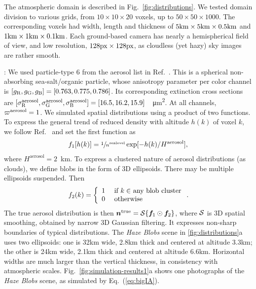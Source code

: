 \documentclass[10pt,letterpaper]{article}
\begin{document}
The atmospheric domain is described in Fig.~\ref{fig:distributions}.
We tested domain division to various grids, from $10\times10 \times
20$ voxels, up to $50\times50 \times 1000$. The corresponding voxels
had width, length and thickness of $5{\rm km}\times 5{\rm km} \times
0.5{\rm km}$ and $1{\rm km}\times 1{\rm km} \times 0.1{\rm km}$.  Each
ground-based camera has nearly a hemispherical field of view, and low
resolution, $128 \rm{px} \times 128 \rm{px}$, as cloudless (yet hazy)
sky images are rather smooth.

: We used particle-type 6 from the aerosol list
in Ref.~\cite{Martonchik2009}. This is a spherical non-absorbing
sea-salt/organic particle, whose anisotropy parameter per color
channel is $[g_{\rm R},g_{\rm G},g_{\rm B}]=[0.763,0.775,0.786]$. Its
corresponding extinction cross sections are $[\sigma^{\rm
  aerosol}_{\rm R}, \sigma^{\rm aerosol}_{\rm G}, \sigma^{\rm
  aerosol}_{\rm
  B}]=[16.5,16.2,15.9]$~\si[sticky-per]{\per\micro\meter\squared}.  At
all channels, $\varpi^{\rm aerosol}=1$. We simulated spatial
distributions using a product of two functions. To express the general
trend of reduced density with altitude $h(k)$ of voxel $k$, we follow
Ref.~\cite{Levi1980} and set the first function as
\begin{align}
  f_1[h(k)] = \sfrac{1} {n^{\rm sealevel}}
  \exp[-h(k)/H^\mathrm{aerosol}],
\end{align}
where $H^\mathrm{aerosol}=2$~\si{\km}. To express a clustered nature
of aerosol distributions (as clouds), we define blobs in the form of
3D ellipsoids. There may be multiple ellipsoids suspended.  Then
\begin{equation}
  f_2(k) =
  \left\{
    \begin{array}{ll}
      1  & \mbox{ if $k\in$ any blob cluster} \\
      0  & \mbox{ otherwise}
      \label{eq:f2}
    \end{array}
  \right.
  .
  \hspace{-0.05cm}
\end{equation}
The true aerosol distribution is then ${\bm n}^{\rm true}={\cal
  S}\{{\bm f}_1\odot {\bm f}_2\}$, where ${\cal S}$ is 3D spatial
smoothing, obtained by narrow 3D Gaussian filtering. It expresses
non-sharp boundaries of typical distributions. The {\em Haze Blobs}
scene in \cref{fig:distributions}a uses two ellipsoids: one is 32km
wide, 2.8km thick and centered at altitude 3.3km; the other is 24km
wide, 2.1km thick and centered at altitude 6.6km. Horizontal widths
are much larger than the vertical thickness, in consistency with
atmospheric scales. Fig.~\ref{fig:simulation-results1}a shows one
photographs of the {\em Haze Blobs} scene, as simulated by
Eq.~(\ref{eq:bigIA}).
\end{document}
